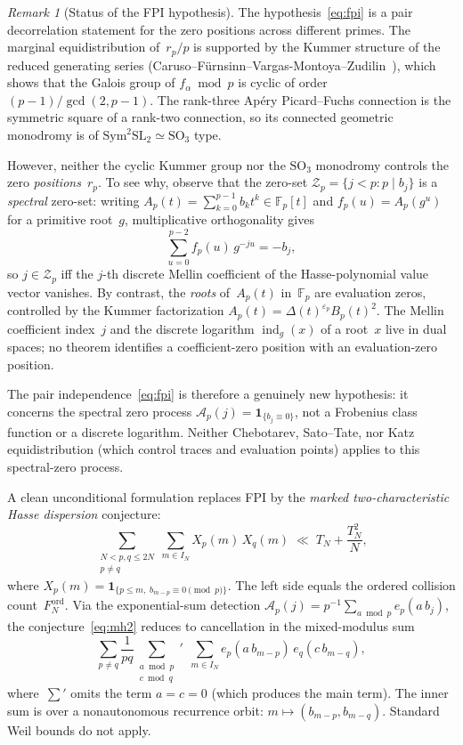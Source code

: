 \documentclass[11pt]{article}
\theoremstyle{definition}
\theoremstyle{remark}
\newtheorem{remark}[theorem]{Remark}
\begin{document}
\begin{remark}[Status of the FPI hypothesis]
\label{rem:fpi-status}
The hypothesis~\eqref{eq:fpi} is
a pair decorrelation statement for the
zero positions across different primes.
The marginal equidistribution of~$r_p/p$
is supported by the Kummer structure
of the reduced generating series (Caruso--F\"urnsinn--Vargas-Montoya--Zudilin~\cite{CFVZ2026}),
which shows that the Galois group of
$f_\alpha \bmod p$ is cyclic of order
$(p-1)/\gcd(2, p-1)$.
The rank-three Ap\'ery Picard--Fuchs
connection is the symmetric square
of a rank-two connection,
so its connected geometric monodromy
is of $\mathrm{Sym}^2 \mathrm{SL}_2
\simeq \mathrm{SO}_3$ type.

However, neither the cyclic Kummer group
nor the $\mathrm{SO}_3$ monodromy
controls the zero \emph{positions}~$r_p$.
To see why, observe that the zero-set
$\mathcal{Z}_p = \{j < p : p \mid b_j\}$
is a \emph{spectral} zero-set:
writing $A_p(t) = \sum_{k=0}^{p-1} b_k t^k
\in \mathbb{F}_p[t]$
and $f_p(u) = A_p(g^u)$ for a primitive
root~$g$, multiplicative orthogonality gives
\[
  \sum_{u=0}^{p-2} f_p(u)\,g^{-ju} = -b_j,
\]
so $j \in \mathcal{Z}_p$ iff the $j$-th
discrete Mellin coefficient of the
Hasse-polynomial value vector vanishes.
By contrast, the \emph{roots} of~$A_p(t)$
in~$\mathbb{F}_p$ are evaluation zeros,
controlled by the Kummer factorization
$A_p(t) = \Delta(t)^{\varepsilon_p} B_p(t)^2$.
The Mellin coefficient index~$j$
and the discrete logarithm
$\operatorname{ind}_g(x)$ of a root~$x$
live in dual spaces; no theorem
identifies a coefficient-zero position
with an evaluation-zero position.

The pair independence~\eqref{eq:fpi}
is therefore a genuinely new hypothesis:
it concerns the spectral zero process
$\mathcal{A}_p(j) = \mathbf{1}_{\{b_j \equiv 0\}}$,
not a Frobenius class function or
a discrete logarithm.
Neither Chebotarev, Sato--Tate,
nor Katz equidistribution
(which control traces and evaluation points)
applies to this spectral-zero process.

A clean unconditional formulation replaces
FPI by the \emph{marked two-characteristic
Hasse dispersion} conjecture:
\begin{equation}\label{eq:mh2}
  \sum_{\substack{N < p, q \le 2N \\ p \ne q}}
  \sum_{m \in I_N}
  X_p(m)\,X_q(m)
  \;\ll\;
  T_N + \frac{T_N^2}{N},
\end{equation}
where $X_p(m) = \mathbf{1}_{\{p \le m,\;
b_{m-p} \equiv 0 \pmod{p}\}}$.
The left side equals the ordered
collision count~$F_N^{\mathrm{ord}}$.
Via the exponential-sum detection
$\mathcal{A}_p(j) = p^{-1}
\sum_{a \bmod p} e_p(a\,b_j)$,
the conjecture~\eqref{eq:mh2} reduces
to cancellation in the mixed-modulus sum
\begin{equation}\label{eq:char-sum}
  \sum_{p \ne q} \frac{1}{pq}
  \sum_{\substack{a \bmod p \\ c \bmod q}}
  {}' \;\,
  \sum_{m \in I_N}
  e_p(a\,b_{m-p})\,e_q(c\,b_{m-q}),
\end{equation}
where~$\sum'$ omits the term $a = c = 0$
(which produces the main term).
The inner sum is over a nonautonomous
recurrence orbit: $m \mapsto (b_{m-p}, b_{m-q})$.
Standard Weil bounds do not apply.


\end{remark}
\end{document}
